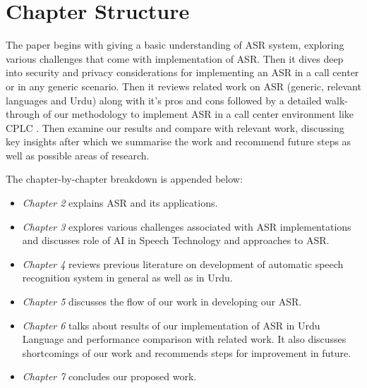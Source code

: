 \section{Chapter Structure} %
\label{sec:chapter-structure}

The paper begins with giving a basic understanding of ASR system, exploring various challenges that come with implementation of ASR. Then it dives deep into security and privacy considerations for implementing an ASR in a call center or in any generic scenario. Then it reviews related work on ASR (generic, relevant languages and Urdu) along with it's pros and cons followed by a detailed walk-through of our methodology to implement ASR in a call center environment like CPLC \cite{cplc_cplc_nodate}. Then examine our results and compare with relevant work, discussing key insights after which we summarise the work and recommend future steps as well as possible areas of research.

The chapter-by-chapter breakdown is appended below:

\begin{itemize}
    \item \textit{Chapter 2} explains ASR and its applications. 
    \item \textit{Chapter 3} explores various challenges associated with ASR implementations and discusses role of AI in Speech Technology and approaches to ASR.
    \item \textit{Chapter 4} reviews previous literature on development of automatic speech recognition system in general as well as in Urdu. 
    \item \textit{Chapter 5} discusses the flow of our work in developing our ASR.
    \item \textit{Chapter 6} talks about results of our implementation of ASR in Urdu Language and performance comparison with related work. It also discusses shortcomings of our work and recommends steps for improvement in future.  
    \item \textit{Chapter 7} concludes our proposed work.
\end{itemize}
